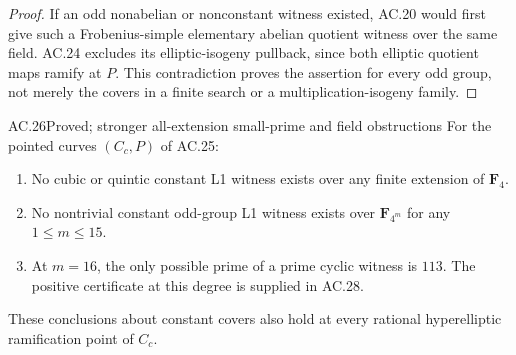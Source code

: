 \begin{proof}
If an odd nonabelian or nonconstant witness existed, AC.20 would first
give such a Frobenius-simple elementary abelian quotient witness over
the same field.  AC.24 excludes its elliptic-isogeny pullback, since
both elliptic quotient maps ramify at $P$.  This contradiction proves
the assertion for every odd group, not merely the covers in a finite
search or a multiplication-isogeny family.
\end{proof}

\begin{claim}{AC.26}{Proved; stronger all-extension small-prime and field obstructions}
For the pointed curves $(C_c,P)$ of AC.25:
\begin{enumerate}
\item No cubic or quintic constant L1 witness exists over any finite
extension of $\mathbf F_4$.
\item No nontrivial constant odd-group L1 witness exists over
$\mathbf F_{4^m}$ for any $1\le m\le15$.
\item At $m=16$, the only possible prime of a prime cyclic witness is
$113$. The positive certificate at this degree is supplied in AC.28.
\end{enumerate}
These conclusions about constant covers also hold at every rational
hyperelliptic ramification point of $C_c$.
\end{claim}
